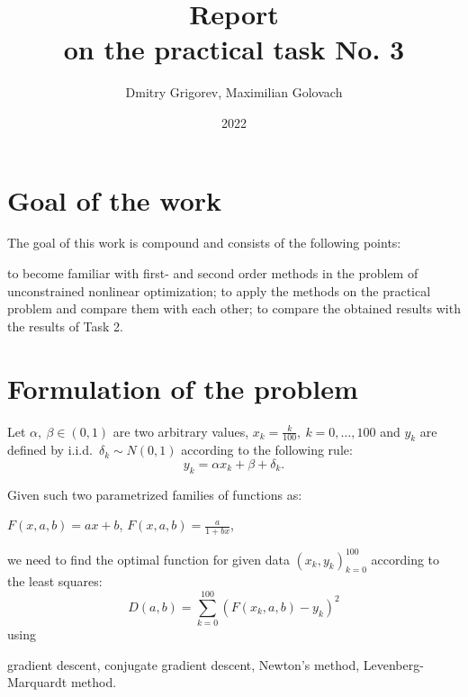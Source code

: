 \documentclass[12pt, bachelor, substylefile = algo_title.rtx]{disser}
\theoremstyle{definition}
\begin{document}
\title{Report\\
on the practical task No. 3}


\author{Dmitry Grigorev, Maximilian Golovach}
\sastatus {}

\date{2022}

\maketitle
\section{Goal of the work}
The goal of this work is compound and consists of the following points:
\begin{outline}
\1 to become familiar with first- and second order methods in the problem of unconstrained nonlinear optimization;
\1 to apply the methods on the practical problem and compare them with each other;
\1 to compare the obtained results with the results of Task 2.
\end{outline}

\section{Formulation of the problem}
\label{sec: probsetup}
Let $\alpha,\ \beta \in (0, 1)$ are two arbitrary values, $x_k = \frac{k}{100},\ k  = 0, \dots, 100$ and $y_k$ are defined by i.i.d.~$\delta_k \sim N(0, 1) $ according to the following rule:
\[ y_k = \alpha x_k + \beta + \delta_k.\]

Given such two parametrized families of functions as:
\begin{outline}[enumerate]
\1 $F(x, a, b) = ax + b$,
\1 $F(x, a, b) = \frac{a}{1+bx}$,
\end{outline}
we need to find the optimal function for given data $(x_k, y_k)_{k = 0}^{100}$ according to the least squares:
\[ D(a, b) = \sum_{k=0}^{100} (F(x_k, a, b) - y_k)^2 \]
using
\begin{outline}
\1 gradient descent,
\1 conjugate gradient descent,
\1 Newton's method,
\1 Levenberg-Marquardt method.
\end{outline}
\end{document}
